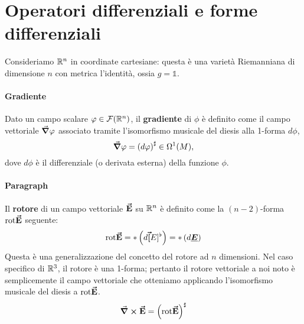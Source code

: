 \section{Operatori differenziali e forme differenziali}
Consideriamo $\mathbb{R}^n$ in coordinate cartesiane: questa è una varietà Riemanniana di dimensione $n$ con metrica l'identità, ossia $g=\mathbb{1}$.\\
\paragraph{Gradiente}
Dato un campo scalare $\varphi\in\mathcal{F}(\mathbb{R}^n)$, il \textbf{gradiente} di $\phi$ è definito come il campo vettoriale $\grad{\varphi}$ associato tramite l'isomorfismo musicale del diesis alla 1-forma $d\phi$,
\begin{equation}
	\grad{\varphi}=\left(d\varphi\right)^{\sharp}\in\Omega^1(M),
\end{equation}
dove $d\phi$ è il differenziale (o derivata esterna) della funzione $\phi$.
\paragraph{Paragraph}
Il \textbf{rotore} di un campo vettoriale $\vb*{\va{E}}$ su $\mathbb{R}^n$ è definito come la $(n-2)$-forma $\mathrm{rot}\vb*{\va{E}}$ seguente:
\begin{equation*}
	\mathrm{rot}\vb*{\va{E}}=\ast\left(d\vb*{\va{[}}E]^\flat\right)=\ast\left(d\vb*{\underline{E}}\right)
\end{equation*}
Questa è una generalizzazione del concetto del rotore ad $n$ dimensioni. Nel caso specifico di $\mathbb{R}^3$, il rotore è una 1-forma; pertanto il rotore vettoriale a noi noto è semplicemente il campo vettoriale che otteniamo applicando l'isomorfismo musicale del diesis a $\mathrm{rot}\vb*{\va{E}}$.
\begin{equation}
	\curl{\vb*{\va{E}}}=\left(\mathrm{rot}\vb*{\va{E}}\right)^\sharp
\end{equation}
